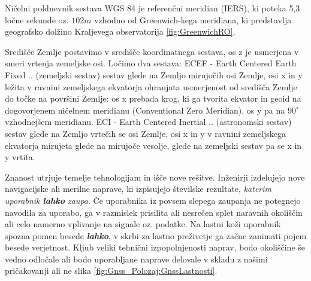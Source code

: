 Ničelni poldnevnik sestava WGS 84 je referenčni meridian (IERS), ki poteka 5,3 ločne sekunde oz. $ 102m $ vzhodno od Greenwich-kega meridiana, ki predstavlja geografsko dolžino Kraljevega observatorija \ref{fig:GreenwichRO}.

Središče Zemlje postavimo v središče koordinatnega sestava, os z je usmerjena v smeri vrtenja zemeljske osi. Ločimo dva sestava:
ECEF - Earth Centered Earth Fixed .. (zemeljski sestav) sestav glede na Zemljo mirujočih osi Zemlje, osi x in y ležita v ravnini zemeljskega ekvatorja ohranjata usmerjenost od središča Zemlje do točke na površini Zemlje: os x prebada krog, ki ga tvorita ekvator in geoid na dogovorjenem ničelnem meridianu (Conventional Zero Meridian), os y pa na $90^\circ$ vzhodnejšem meridianu.    
ECI - Earth Centered Inertial .. (astronomski sestav) sestav glede na Zemljo vrtečih se osi Zemlje, osi x in y v ravnini zemeljskega ekvatorja mirujeta glede na mirujoče vesolje, glede na zemeljski sestav pa se x in y vrtita.






     



Znanost utrjuje temelje tehnologijam in išče nove rešitve. Inženirji izdelujejo nove navigacijske ali merilne naprave, ki izpisujejo številske rezultate, \textit{katerim uporabnik \textbf{lahko} zaupa}. Če uporabnika iz povsem slepega zaupanja ne potegnejo navodila za uporabo, ga v razmislek prisilita ali nesrečen splet naravnih okoliščin ali celo namerno vplivanje na signale oz. podatke. Na lastni koži uporabnik spozna pomen besede \textbf{\textit{lahko}}, v skrbi za lastno preživetje ga začne zanimati pojem besede verjetnost. 
Kljub veliki tehnični izpopolnjenosti naprav, bodo okoliščine še vedno odločale ali bodo uporabljane naprave delovale v skladu z našimi pričakovanji ali ne slika \ref{fig:Gnss_Polozaj:GnssLastnosti}.

